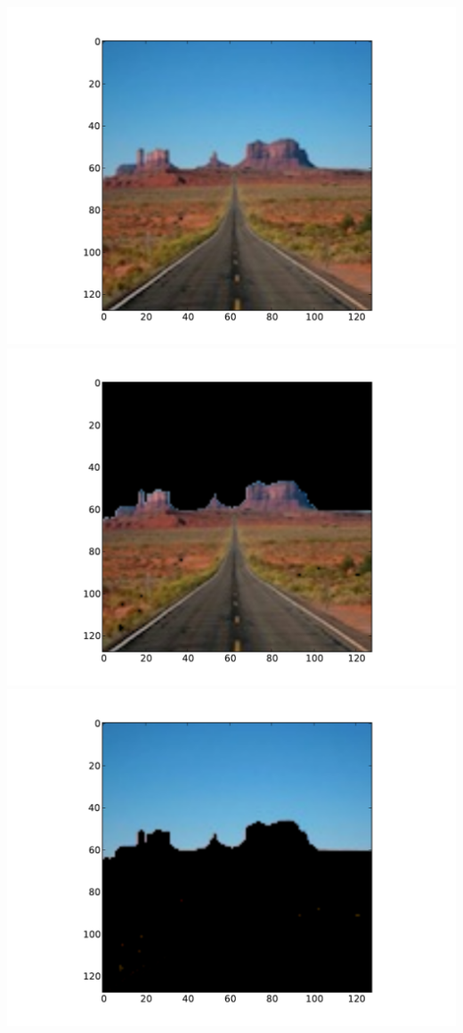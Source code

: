 \begin{center}
\includegraphics[scale=0.2]{monument}
\includegraphics[scale=0.2]{segment1}
\includegraphics[scale=0.2]{segment2}
\end{center}

